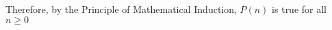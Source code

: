 \documentclass[10pt]{exam}
\def\vertexsize{4 pt}
\newcommand{\vtx}[2]{node[fill,circle,inner sep=0 pt, minimum size=\vertexsize,label=#1:#2]{}}
\renewcommand{\v}{\vtx{above}{}}
\begin{document}
\begin{questions}
\begin{solution}
\begin{parts}
    Therefore, by the Principle of Mathematical Induction, $P(n)$ is true for all $n \ge 0$
  \end{parts}
\end{solution}


%
%
%
%
%
%
%


\end{questions}
\end{document}
